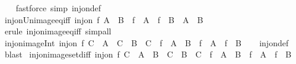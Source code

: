 \begin{isabellebody}
%
\isadelimproof
\ \ %
\endisadelimproof
%
\isatagproof
{}\isamarkupfalse%
\ {\isacharparenleft}{\kern0pt}fastforce\ simp{\isacharcolon}{\kern0pt}\ inj{\isacharunderscore}{\kern0pt}on{\isacharunderscore}{\kern0pt}def{\isacharparenright}{\kern0pt}%
\endisatagproof
{\isafoldproof}%
%
\isadelimproof
\isanewline
%
\endisadelimproof
\isanewline
{}\isamarkupfalse%
\ inj{\isacharunderscore}{\kern0pt}on{\isacharunderscore}{\kern0pt}Un{\isacharunderscore}{\kern0pt}image{\isacharunderscore}{\kern0pt}eq{\isacharunderscore}{\kern0pt}iff{\isacharcolon}{\kern0pt}\ {\isachardoublequoteopen}inj{\isacharunderscore}{\kern0pt}on\ f\ {\isacharparenleft}{\kern0pt}A\ {\isasymunion}\ B{\isacharparenright}{\kern0pt}\ {\isasymLongrightarrow}\ f\ {\isacharbackquote}{\kern0pt}\ A\ {\isacharequal}{\kern0pt}\ f\ {\isacharbackquote}{\kern0pt}\ B\ {\isasymlongleftrightarrow}\ A\ {\isacharequal}{\kern0pt}\ B{\isachardoublequoteclose}\isanewline
%
\isadelimproof
\ \ %
\endisadelimproof
%
\isatagproof
{}\isamarkupfalse%
\ {\isacharparenleft}{\kern0pt}erule\ inj{\isacharunderscore}{\kern0pt}on{\isacharunderscore}{\kern0pt}image{\isacharunderscore}{\kern0pt}eq{\isacharunderscore}{\kern0pt}iff{\isacharparenright}{\kern0pt}\ simp{\isacharunderscore}{\kern0pt}all%
\endisatagproof
{\isafoldproof}%
%
\isadelimproof
\isanewline
%
\endisadelimproof
\isanewline
{}\isamarkupfalse%
\ inj{\isacharunderscore}{\kern0pt}on{\isacharunderscore}{\kern0pt}image{\isacharunderscore}{\kern0pt}Int{\isacharcolon}{\kern0pt}\ {\isachardoublequoteopen}inj{\isacharunderscore}{\kern0pt}on\ f\ C\ {\isasymLongrightarrow}\ A\ {\isasymsubseteq}\ C\ {\isasymLongrightarrow}\ B\ {\isasymsubseteq}\ C\ {\isasymLongrightarrow}\ f\ {\isacharbackquote}{\kern0pt}\ {\isacharparenleft}{\kern0pt}A\ {\isasyminter}\ B{\isacharparenright}{\kern0pt}\ {\isacharequal}{\kern0pt}\ f\ {\isacharbackquote}{\kern0pt}\ A\ {\isasyminter}\ f\ {\isacharbackquote}{\kern0pt}\ B{\isachardoublequoteclose}\isanewline
%
\isadelimproof
\ \ %
\endisadelimproof
%
\isatagproof
{}\isamarkupfalse%
\ inj{\isacharunderscore}{\kern0pt}on{\isacharunderscore}{\kern0pt}def\ \isamarkupfalse%
\ blast%
\endisatagproof
{\isafoldproof}%
%
\isadelimproof
\isanewline
%
\endisadelimproof
\isanewline
{}\isamarkupfalse%
\ inj{\isacharunderscore}{\kern0pt}on{\isacharunderscore}{\kern0pt}image{\isacharunderscore}{\kern0pt}set{\isacharunderscore}{\kern0pt}diff{\isacharcolon}{\kern0pt}\ {\isachardoublequoteopen}inj{\isacharunderscore}{\kern0pt}on\ f\ C\ {\isasymLongrightarrow}\ A\ {\isacharminus}{\kern0pt}\ B\ {\isasymsubseteq}\ C\ {\isasymLongrightarrow}\ B\ {\isasymsubseteq}\ C\ {\isasymLongrightarrow}\ f\ {\isacharbackquote}{\kern0pt}\ {\isacharparenleft}{\kern0pt}A\ {\isacharminus}{\kern0pt}\ B{\isacharparenright}{\kern0pt}\ {\isacharequal}{\kern0pt}\ f\ {\isacharbackquote}{\kern0pt}\ A\ {\isacharminus}{\kern0pt}\ f\ {\isacharbackquote}{\kern0pt}\ B{\isachardoublequoteclose}\isanewline

\end{isabellebody}

